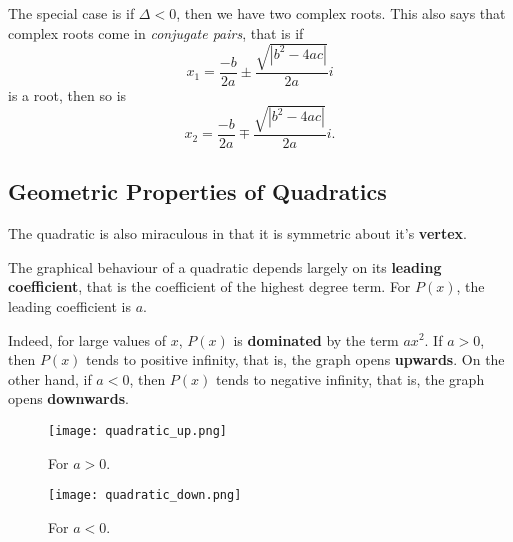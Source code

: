 \documentclass[../jarvis.tex]{subfiles}
\begin{document}
The special case is if $\Delta<0$, then we have two complex roots. This also says that complex roots come in \textit{conjugate pairs}, that is if
$$x_1=\frac{-b}{2a}\pm\frac{\sqrt{|b^2-4ac|}}{2a}i$$
is a root, then so is
$$x_2=\frac{-b}{2a}\mp\frac{\sqrt{|b^2-4ac|}}{2a}i.$$

\subsection{Geometric Properties of Quadratics}
The quadratic is also miraculous in that it is symmetric about it's \textbf{vertex}.

The graphical behaviour of a quadratic depends largely on its \textbf{leading coefficient}, that is the coefficient of the highest degree term. For $P(x)$, the leading coefficient is $a$.

Indeed, for large values of $x$, $P(x)$ is \textbf{dominated} by the term $ax^2$. If $a>0$, then $P(x)$ tends to positive infinity, that is, the graph opens \textbf{upwards}. On the other hand, if $a<0$, then $P(x)$ tends to negative infinity, that is, the graph opens \textbf{downwards}.

\begin{figure}
    \centering
    \begin{minipage}{.5\textwidth}
      \centering
      \texttt{[image: quadratic\_up.png]}
      \caption{For $a>0$.}
    \end{minipage}%
    \begin{minipage}{.5\textwidth}
      \centering
      \texttt{[image: quadratic\_down.png]}
      \caption{For $a<0$.}
    \end{minipage}
\end{figure}
\end{document}
